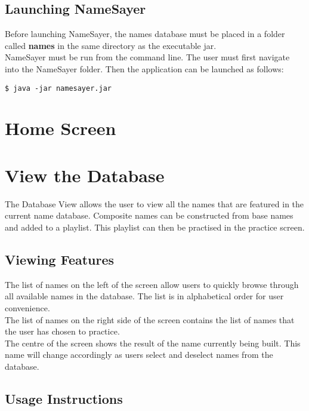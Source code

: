 \documentclass{article}
\begin{document}
\subsection{Launching NameSayer}
Before launching NameSayer, the names database must be placed in a folder called \textbf{names} in the same directory as 
the executable jar. \\

NameSayer must be run from the command line. The user must first navigate into the NameSayer folder. Then the application
can be launched as follows: 

\begin{verbatim}
$ java -jar namesayer.jar
\end{verbatim}

\section{Home Screen}

\section{View the Database}
The Database View allows the user to view all the names that are 
featured in the current name database. Composite names can be constructed from base names and added to a playlist. This playlist can then be practised in the practice screen.

\subsection{Viewing Features}
The list of names on the left of the screen allow users to quickly browse through all available names in the database.
The list is in alphabetical order for user convenience. \\

The list of names on the right side of the screen contains the list of names that the user has chosen to practice. \\

The centre of the screen shows the result of the name currently being built. This name will change accordingly as users select and 
deselect names from the database.

\subsection{Usage Instructions}
\end{document}
